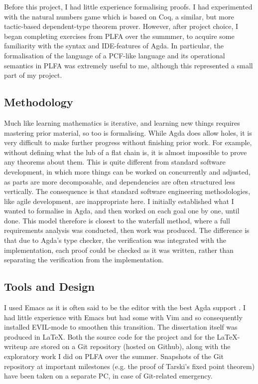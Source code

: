 \documentclass[12pt,a4paper,twoside,openright]{report}
\begin{document}
Before this project, I had little experience formalising proofs. I had experimented with the natural numbers game \cite{NatNums} which is based on Coq, a similar, but more tactic-based dependent-type theorem prover. However, after project choice, I began completing exercises from PLFA \cite{PLFA} over the summmer, to acquire some familiarity with the syntax and IDE-features of Agda. In particular, the formalisation of the language of a PCF-like language and its operational semantics in PLFA was extremely useful to me, although this represented a small part of my project.
\subsection{Methodology}
Much like learning mathematics is iterative, and learning new things requires mastering prior material, so too is formalising. While Agda does allow holes, it is very difficult to make further progress without finishing prior work. For example, without defining what the lub of a flat chain is, it is almost impossible to prove any theorems about them. This is quite different from standard software development, in which more things can be worked on concurrently and adjusted, as parts are more decomposable, and dependencies are often structured less vertically. The consequence is that standard software engineering methodologies, like agile development, are inappropriate here. I initially established what I wanted to formalise in Agda, and then worked on each goal one by one, until done. This model therefore is closest to the waterfall method, where a full requirements analysis was conducted, then work was produced. The difference is that due to Agda's type checker, the verification was integrated with the implementation, each proof could be checked as it was written, rather than separating the verification from the implementation. 
\subsection{Tools and Design}
I used Emacs \cite{Emacs} as it is often said to be the editor with the best Agda support \cite{PLFA}. I had little experience with Emacs but had some with Vim and so consequently installed EVIL-mode \cite{Evil} to smoothen this transition. The dissertation itself was produced in \LaTeX. Both the source code for the project and for the \LaTeX-writeup are stored on a Git repository (hosted on Github), along with the exploratory work I did on PLFA over the summer. Snapshots of the Git repository at important milestones (e.g. the proof of Tarski's fixed point theorem) have been taken on a separate PC, in case of Git-related emergency. 
\end{document}
